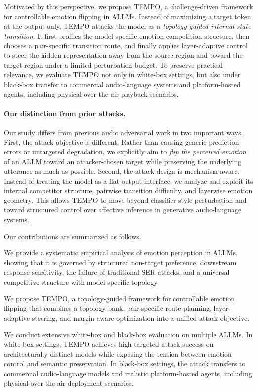 Motivated by this perspective, we propose \textsc{TEMPO}, a challenge-driven framework for controllable emotion flipping in ALLMs.
Instead of maximizing a target token at the output only, \textsc{TEMPO} attacks the model as a \emph{topology-guided internal state transition}.
It first profiles the model-specific emotion competition structure, then chooses a pair-specific transition route, and finally applies layer-adaptive control to steer the hidden representation away from the source region and toward the target region under a limited perturbation budget.
To preserve practical relevance, we evaluate \textsc{TEMPO} not only in white-box settings, but also under black-box transfer to commercial audio-language systems and platform-hosted agents, including physical over-the-air playback scenarios.

\paragraph{Our distinction from prior attacks.}
Our study differs from previous audio adversarial work in two important ways.
First, the attack objective is different.
Rather than causing generic prediction errors or untargeted degradation, we explicitly aim to \emph{flip the perceived emotion} of an ALLM toward an attacker-chosen target while preserving the underlying utterance as much as possible.
Second, the attack design is mechanism-aware.
Instead of treating the model as a flat output interface, we analyze and exploit its internal competitor structure, pairwise transition difficulty, and layerwise emotion geometry.
This allows \textsc{TEMPO} to move beyond classifier-style perturbation and toward structured control over affective inference in generative audio-language systems.

Our contributions are summarized as follows.
\begin{packeditemize}
    \item We provide a systematic empirical analysis of emotion perception in ALLMs, showing that it is governed by structured non-target preference, downstream response sensitivity, the failure of traditional SER attacks, and a universal competitive structure with model-specific topology.

    \item We propose \textsc{TEMPO}, a topology-guided framework for controllable emotion flipping that combines a topology bank, pair-specific route planning, layer-adaptive steering, and margin-aware optimization into a unified attack objective.

    \item We conduct extensive white-box and black-box evaluation on multiple ALLMs.
    In white-box settings, \textsc{TEMPO} achieves high targeted attack success on architecturally distinct models while exposing the tension between emotion control and semantic preservation.
    In black-box settings, the attack transfers to commercial audio-language models and realistic platform-hosted agents, including physical over-the-air deployment scenarios.
\end{packeditemize}


